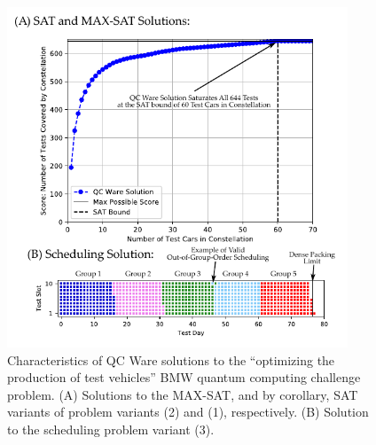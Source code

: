 \documentclass[aps,prl,twocolumn,superscriptaddress,groupedaddress]{revtex4}  %
\begin{document}
\begin{figure}[ht]
\begin{center}
\includegraphics[width=4in]{figures/solution.pdf}
\caption{Characteristics of QC Ware solutions to the ``optimizing the production
of test vehicles'' BMW quantum computing challenge problem. (A) Solutions
to the MAX-SAT, and by corollary, SAT variants of problem variants (2) and (1),
respectively. (B) Solution to the scheduling problem variant (3).}
\label{fig:solution}
\end{center}
\end{figure}
\end{document}
